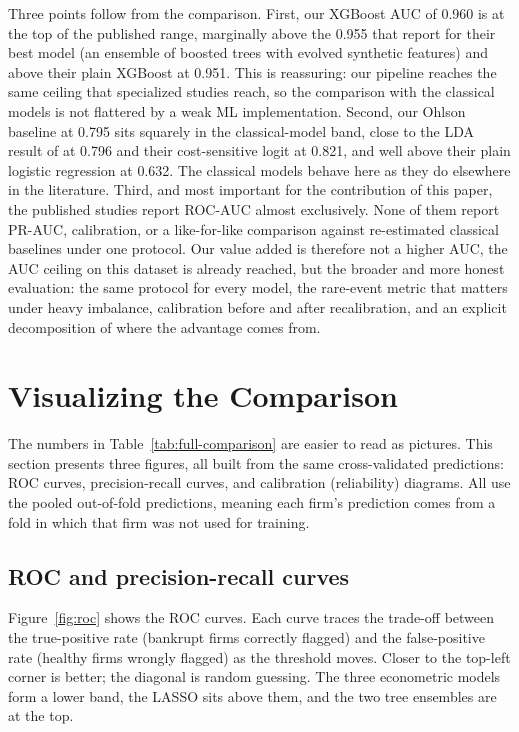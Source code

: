 \documentclass[12pt,a4paper]{article}
\begin{document}
Three points follow from the comparison. First, our XGBoost AUC of 0.960 is at
the top of the published range, marginally above the 0.955 that
\cite{zieba2016} report for their best model (an ensemble of boosted trees with
evolved synthetic features) and above their plain XGBoost at 0.951. This is
reassuring: our pipeline reaches the same ceiling that specialized studies
reach, so the comparison with the classical models is not flattered by a weak
ML implementation. Second, our Ohlson baseline at 0.795 sits squarely in the
classical-model band, close to the LDA result of \cite{zieba2016} at 0.796 and
their cost-sensitive logit at 0.821, and well above their plain logistic
regression at 0.632. The classical models behave here as they do elsewhere in
the literature. Third, and most important for the contribution of this paper,
the published studies report ROC-AUC almost exclusively. None of them report
PR-AUC, calibration, or a like-for-like comparison against re-estimated
classical baselines under one protocol. Our value added is therefore not a
higher AUC, the AUC ceiling on this dataset is already reached, but the
broader and more honest evaluation: the same protocol for every model, the
rare-event metric that matters under heavy imbalance, calibration before and
after recalibration, and an explicit decomposition of where the advantage
comes from.

\clearpage
\section{Visualizing the Comparison}\label{sec:figures}

The numbers in Table~\ref{tab:full-comparison} are easier to read as pictures.
This section presents three figures, all built from the same cross-validated
predictions: ROC curves, precision-recall curves, and calibration
(reliability) diagrams. All use the pooled out-of-fold predictions, meaning
each firm's prediction comes from a fold in which that firm was not used for
training.

\subsection{ROC and precision-recall curves}

Figure~\ref{fig:roc} shows the ROC curves. Each curve traces the trade-off between the true-positive rate (bankrupt
firms correctly flagged) and the false-positive rate (healthy firms wrongly
flagged) as the threshold moves. Closer to the top-left corner is better;
the diagonal is random guessing. The three econometric models form a lower
band, the LASSO sits above them, and the two tree ensembles are at the top.
\end{document}
